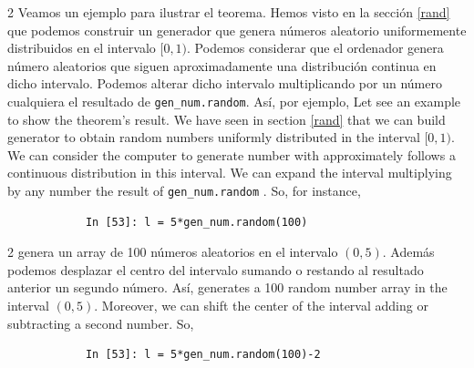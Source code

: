 \begin{paracol}{2}
Veamos un ejemplo para ilustrar el teorema. Hemos visto en la sección \ref{rand} que podemos construir un generador que genera números aleatorio uniformemente distribuidos en el intervalo $[0,1)$. Podemos considerar que el ordenador genera número aleatorios que siguen aproximadamente una distribución continua en dicho intervalo. Podemos alterar dicho intervalo multiplicando por un número cualquiera el resultado de \texttt{gen\_num.random}. Así, por ejemplo,
\switchcolumn
Let see an example to show the theorem's result. We have seen in section \ref{rand} that we can build generator to obtain random numbers uniformly distributed in the interval $[0,1)$. We can consider the computer to generate number with approximately follows a continuous distribution in this interval. We can expand the interval multiplying by any number the result of \texttt{gen\_num.random} . So, for instance, 
\end{paracol}
\begin{center}
	\begin{minipage}{\textwidth}
		\begin{verbatim}
			In [53]: l = 5*gen_num.random(100)
		\end{verbatim}
	\end{minipage}
\end{center}

\begin{paracol}{2}
genera un array de 100 números aleatorios en el intervalo $(0,5)$.
Además podemos desplazar el centro del intervalo sumando o restando al resultado anterior un segundo número. Así,
\switchcolumn
generates a 100 random number array in the interval $(0,5)$.
Moreover, we can shift the center of the interval adding or subtracting a second number. So, 
\end{paracol}


\begin{center}
	\begin{minipage}{\textwidth}
		\begin{verbatim}
			In [53]: l = 5*gen_num.random(100)-2
		\end{verbatim}
	\end{minipage}
\end{center}

